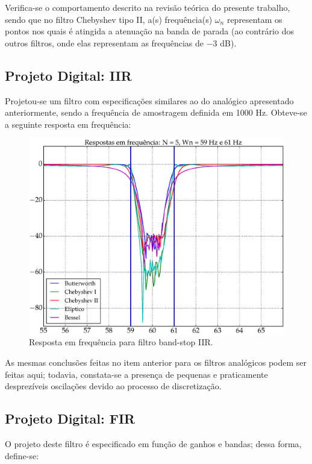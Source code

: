 Verifica-se o comportamento descrito na revisão teórica do presente trabalho, sendo que no filtro Chebyshev tipo II, a(s) frequência(s) $\omega_n$ representam os pontos nos quais é atingida a atenuação na banda de parada (ao contrário dos outros filtros, onde elas representam as frequências de $-3$ dB).

\subsection{Projeto Digital: IIR}
Projetou-se um filtro com especificações similares ao do analógico apresentado anteriormente, sendo a frequência de amostragem definida em 1000 Hz. Obteve-se a seguinte resposta em frequência:

\begin{figure}[H]
  \centering
  \includegraphics[scale=0.55]{images/plots/bandstop_IIR}
  \caption{Resposta em frequência para filtro band-stop IIR.}
  \label{fig:bandstop_IIR_response}
\end{figure}

As mesmas conclusões feitas no item anterior para os filtros analógicos podem ser feitas aqui; todavia, constata-se a presença de pequenas e praticamente desprezíveis oscilações devido ao processo de discretização.

\newpage
\subsection{Projeto Digital: FIR}
O projeto deste filtro é especificado em função de ganhos e bandas; dessa forma, define-se:

